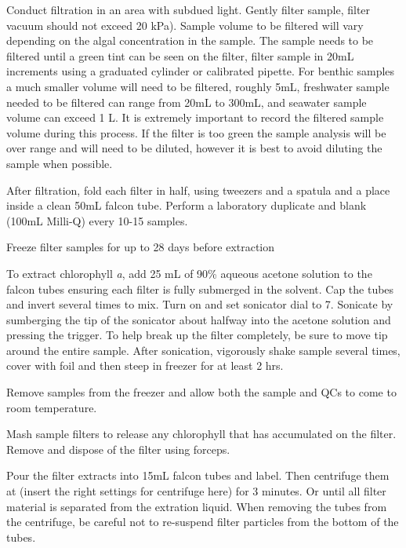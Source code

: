 \documentclass[12pt]{../SOP3_alpha}
\begin{document}
\NP Conduct filtration in an area with subdued light. Gently filter sample, filter vacuum should not exceed 20 kPa). Sample volume to be filtered will vary depending on the algal concentration in the sample. The sample needs to be filtered until a green tint can be seen on the filter, filter sample in 20mL increments using a graduated cylinder or calibrated pipette. For benthic samples a much smaller volume will need to be filtered, roughly 5mL, freshwater sample needed to be filtered can range from 20mL to 300mL, and seawater sample volume can exceed 1 L. It is extremely important to record the filtered sample volume during this process. If the filter is too green the sample analysis will be over range and will need to be diluted, however it is best to avoid diluting the sample when possible. 

\NP After filtration, fold each filter in half, using tweezers and a spatula and a place inside a clean 50mL falcon tube. Perform a laboratory duplicate and blank (100mL Milli-Q) every 10-15 samples.

\NP Freeze filter samples for up to 28 days before extraction

\NP To extract chlorophyll \textit{a}, add 25 mL of 90\% aqueous acetone solution to the falcon tubes ensuring each filter is fully submerged in the solvent. Cap the tubes and invert several times to mix. Turn on and set sonicator dial to 7. Sonicate by sumberging the tip of the sonicator about halfway into the acetone solution and pressing the trigger. To help break up the filter completely, be sure to move tip around the entire sample. After sonication, vigorously shake sample several times, cover with foil and then steep in freezer for at least 2 hrs.

\NP Remove samples from the freezer and allow both the sample and QCs to come to room temperature. 

\NP Mash sample filters to release any chlorophyll that has accumulated on the filter. Remove and dispose of the filter using forceps.

\NP Pour the filter extracts into 15mL falcon tubes and label. Then centrifuge them at (insert the right settings for centrifuge here) for 3 minutes. Or until all filter material is separated from the extration liquid. When removing the tubes from the centrifuge, be careful not to re-suspend filter particles from the bottom of the tubes.
\end{document}
